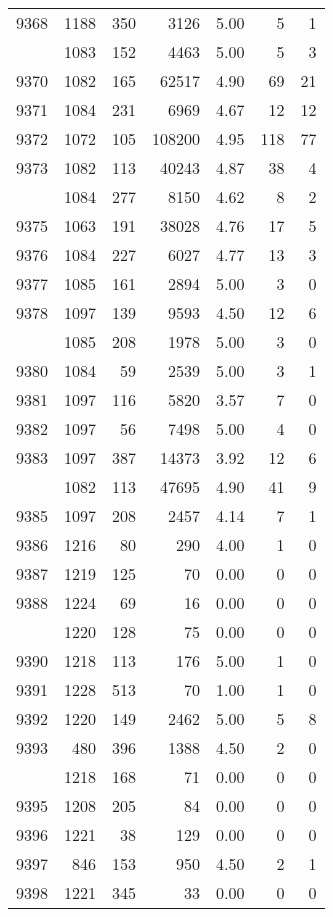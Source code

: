 \documentclass[
]{article}
\begin{document}
\begin{table}
\begin{tabular}[t]{lrrrrrr}
9368 & 1188 & 350 & 3126 & 5.00 & 5 & 1\\
\addlinespace
9369 & 1083 & 152 & 4463 & 5.00 & 5 & 3\\
9370 & 1082 & 165 & 62517 & 4.90 & 69 & 21\\
9371 & 1084 & 231 & 6969 & 4.67 & 12 & 12\\
9372 & 1072 & 105 & 108200 & 4.95 & 118 & 77\\
9373 & 1082 & 113 & 40243 & 4.87 & 38 & 4\\
\addlinespace
9374 & 1084 & 277 & 8150 & 4.62 & 8 & 2\\
9375 & 1063 & 191 & 38028 & 4.76 & 17 & 5\\
9376 & 1084 & 227 & 6027 & 4.77 & 13 & 3\\
9377 & 1085 & 161 & 2894 & 5.00 & 3 & 0\\
9378 & 1097 & 139 & 9593 & 4.50 & 12 & 6\\
\addlinespace
9379 & 1085 & 208 & 1978 & 5.00 & 3 & 0\\
9380 & 1084 & 59 & 2539 & 5.00 & 3 & 1\\
9381 & 1097 & 116 & 5820 & 3.57 & 7 & 0\\
9382 & 1097 & 56 & 7498 & 5.00 & 4 & 0\\
9383 & 1097 & 387 & 14373 & 3.92 & 12 & 6\\
\addlinespace
9384 & 1082 & 113 & 47695 & 4.90 & 41 & 9\\
9385 & 1097 & 208 & 2457 & 4.14 & 7 & 1\\
9386 & 1216 & 80 & 290 & 4.00 & 1 & 0\\
9387 & 1219 & 125 & 70 & 0.00 & 0 & 0\\
9388 & 1224 & 69 & 16 & 0.00 & 0 & 0\\
\addlinespace
9389 & 1220 & 128 & 75 & 0.00 & 0 & 0\\
9390 & 1218 & 113 & 176 & 5.00 & 1 & 0\\
9391 & 1228 & 513 & 70 & 1.00 & 1 & 0\\
9392 & 1220 & 149 & 2462 & 5.00 & 5 & 8\\
9393 & 480 & 396 & 1388 & 4.50 & 2 & 0\\
\addlinespace
9394 & 1218 & 168 & 71 & 0.00 & 0 & 0\\
9395 & 1208 & 205 & 84 & 0.00 & 0 & 0\\
9396 & 1221 & 38 & 129 & 0.00 & 0 & 0\\
9397 & 846 & 153 & 950 & 4.50 & 2 & 1\\
9398 & 1221 & 345 & 33 & 0.00 & 0 & 0\\

\end{tabular}
\end{table}
\end{document}
